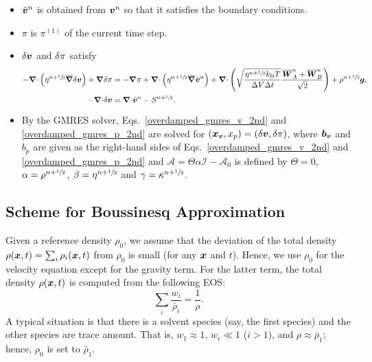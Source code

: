 \documentclass[
10pt
showpacs, showkeys,
amsmath,amssymb,
aps,
pre,
floatfix,
]{revtex4-1}
\newcommand{\divg}{{\V\nabla\cdot}}                       %
\newcommand{\paren}[1]{{(#1)}}                            %
\begin{document}
\begin{enumerate}
\begin{itemize}
\item $\bar{\boldsymbol{v}}^n$ is obtained from $\boldsymbol{v}^n$ so that it satisfies the boundary conditions.
\item $\pi$ is $\pi^\paren{1}$ of the current time step.
\item $\delta\boldsymbol{v}$ and $\delta\pi$ satisfy
\begin{align}
\label{overdamped_gmres_v_2nd}
-\divg\left(\eta^{n+\myhalf}\overline{\grad}\d{\V{v}}\right) + \grad\d{\pi}
& = -\grad\pi +\divg\left( \eta^{n+\myhalf} \overline{\grad}\bar{\V{v}}^n \right)
+ \divg\left( \sqrt{\frac{\eta^{n+\myhalf} k_\mathrm{B}T}{\D{V}\D{t}} } \frac{\overline{\V{W}}^n_A + \overline{\V{W}}^n_B}{\sqrt{2}} \right) + \rho^{n+\myhalf}\V{g}, \\
\label{overdamped_gmres_p_2nd}
-\divg\d{\V{v}} & = \divg\bar{\V{v}}^n-S^{n+\myhalf}.
\end{align}
\item By the GMRES solver, Eqs.~\eqref{overdamped_gmres_v_2nd} and \eqref{overdamped_gmres_p_2nd} are solved for $(\boldsymbol{x}_{\boldsymbol{v}},x_p)=(\delta\boldsymbol{v},\delta\pi)$, where $\boldsymbol{b}_{\boldsymbol{v}}$ and $b_p$ are given as the right-hand sides of Eqs.~\eqref{overdamped_gmres_v_2nd} and \eqref{overdamped_gmres_p_2nd} and $\mathcal{A}=\Theta\alpha\mathcal{I}-\mathcal{A}_0$ is defined by $\Theta=0$, $\alpha=\rho^{n+\sfrac{1}{2}}$, $\beta=\eta^{n+\sfrac{1}{2}}$ and $\gamma=\kappa^{n+\sfrac{1}{2}}$.
\end{itemize}

\end{enumerate}



\clearpage



\subsection{Scheme for Boussinesq Approximation}

Given a reference density $\rho_0$, we assume that the deviation of the total density $\rho(\boldsymbol{x},t) = \sum_i \rho_i(\boldsymbol{x},t)$ from $\rho_0$ is small (for any $\boldsymbol{x}$ and $t$).
Hence, we use $\rho_0$ for the velocity equation except for the gravity term.
For the latter term, the total density $\rho(\boldsymbol{x},t)$ is computed from the following EOS:  
\begin{equation}
\sum_i \frac{w_i}{\bar{\rho}_i} = \frac{1}{\rho}.
\end{equation}
A typical situation is that there is a solvent species (say, the first species) and the other species are trace amount.
That is, $w_1\approx 1$, $w_i\ll 1$ ($i>1$), and $\rho\approx\bar{\rho}_1$; hence, $\rho_0$ is set to $\bar{\rho}_1$.
\end{document}
